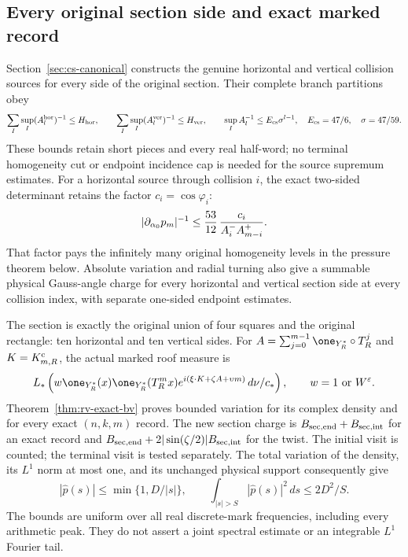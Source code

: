 \subsection*{Every original section side and exact marked record}
Section~\ref{sec:cs-canonical} constructs the genuine horizontal
and vertical collision sources for every side of the original
section. Their complete branch partitions obey
\[
 \sum_I\sup_I(A_l^{\rm hor})^{-1}\le H_{\rm hor},\qquad
 \sum_I\sup_I(A_l^{\rm ver})^{-1}\le H_{\rm ver},\qquad
 \sup_I A_l^{-1}\le E_{\rm cs}\sigma^{l-1},
 \quad E_{\rm cs}=47/6,\quad\sigma=47/59.
\]
These bounds retain short pieces and every real half-word; no
terminal homogeneity cut or endpoint incidence cap is needed for
the source supremum estimates. For a horizontal source through
collision $i$, the exact two-sided determinant retains the factor
$c_i=\cos\varphi_i$:
\[
 |\partial_{\alpha_0}p_m|^{-1}
 \le {53\over12}\,{c_i\over A_i^-A_{m-i}^+}.
\]
That factor pays the infinitely many original homogeneity levels
in the pressure theorem below. Absolute variation and radial
turning also give a summable physical Gauss-angle charge for
every horizontal and vertical section side at every collision
index, with separate one-sided endpoint estimates.

The section is exactly the original union of four squares and
the original rectangle: ten horizontal and ten vertical sides.
For $A=\sum_{j=0}^{m-1}\one_{Y_R^*}\circ T_R^j$ and
$K=K^{\rm c}_{m,R}$, the actual marked roof measure is
\[
 L_*\left(w\one_{Y_R^*}(x)\one_{Y_R^*}(T_R^mx)
      e^{i(\xi\cdot K+\zeta A+\upsilon m)}\,d\nu/c_*\right),
 \qquad w=1\ \hbox{or}\ W^\varepsilon.
\]
Theorem~\ref{thm:rv-exact-bv} proves bounded variation for its
complex density and for every exact $(n,k,m)$ record. The new
section charge is $B_{\rm sec,end}+B_{\rm sec,int}$ for an exact
record and
$B_{\rm sec,end}+2|\sin(\zeta/2)|B_{\rm sec,int}$ for the twist.
The initial visit is counted; the terminal visit is tested
separately. The total variation of the density, its $L^1$ norm
at most one, and its unchanged physical support consequently give
\begin{equation}\label{eq:intro-fourier}
 |\widehat p(s)|\le\min\{1,D/|s|\},\qquad
 \int_{|s|>S}|\widehat p(s)|^2\,ds\le2D^2/S.
\end{equation}
The bounds are uniform over all real discrete-mark frequencies,
including every arithmetic peak. They do not assert a joint
spectral estimate or an integrable $L^1$ Fourier tail.

